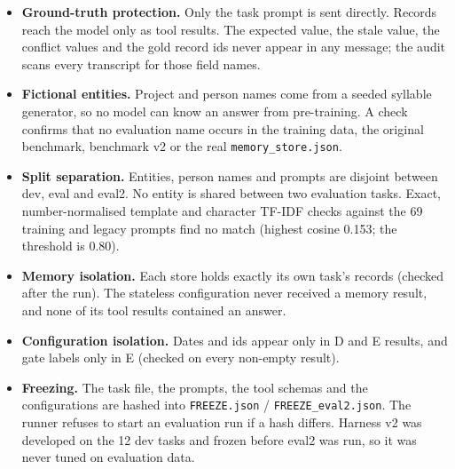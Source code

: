 \documentclass[10.5pt,a4paper,oneside]{report}
\begin{document}
\begin{itemize}
\item \textbf{Ground-truth protection.} Only the task prompt is sent directly. Records reach the model only as tool results. The expected value, the stale value, the conflict values and the gold record ids never appear in any message; the audit scans every transcript for those field names.
\item \textbf{Fictional entities.} Project and person names come from a seeded syllable generator, so no model can know an answer from pre-training. A check confirms that no evaluation name occurs in the training data, the original benchmark, benchmark v2 or the real \texttt{memory\_\allowbreak{}store.\allowbreak{}json}.
\item \textbf{Split separation.} Entities, person names and prompts are disjoint between dev, eval and eval2. No entity is shared between two evaluation tasks. Exact, number-normalised template and character TF-IDF checks against the 69 training and legacy prompts find no match (highest cosine 0.153; the threshold is 0.80).
\item \textbf{Memory isolation.} Each store holds exactly its own task's records (checked after the run). The stateless configuration never received a memory result, and none of its tool results contained an answer.
\item \textbf{Configuration isolation.} Dates and ids appear only in D and E results, and gate labels only in E (checked on every non-empty result).
\item \textbf{Freezing.} The task file, the prompts, the tool schemas and the configurations are hashed into \texttt{FREEZE.\allowbreak{}json} / \texttt{FREEZE\_\allowbreak{}eval2.\allowbreak{}json}. The runner refuses to start an evaluation run if a hash differs. Harness v2 was developed on the 12 dev tasks and frozen before eval2 was run, so it was never tuned on evaluation data.
\end{itemize}
\end{document}
